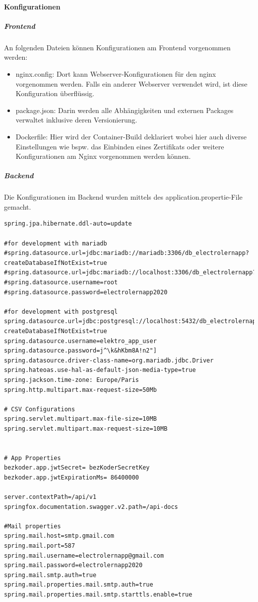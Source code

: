 \paragraph{Konfigurationen}
\subparagraph{Frontend}
An folgenden Dateien können Konfigurationen am Frontend vorgenommen werden:
\begin{itemize}
    \item nginx.config: Dort kann Webserver-Konfigurationen für den nginx vorgenommen werden. Falls ein anderer Webserver verwendet wird, ist diese Konfiguration überflüssig.
    \item package.json: Darin werden alle Abhängigkeiten und externen Packages verwaltet inklusive deren Versionierung.
    \item Dockerfile: Hier wird der Container-Build deklariert wobei hier auch diverse Einstellungen wie bspw. das Einbinden eines Zertifikats oder weitere Konfigurationen am Nginx vorgenommen werden können.
\end{itemize}
\newpage
\subparagraph{Backend}
Die Konfigurationen im Backend wurden mittels des application.propertie-File gemacht.
\begin{verbatim}
spring.jpa.hibernate.ddl-auto=update

#for development with mariadb
#spring.datasource.url=jdbc:mariadb://mariadb:3306/db_electrolernapp?
createDatabaseIfNotExist=true
#spring.datasource.url=jdbc:mariadb://localhost:3306/db_electrolernapp?
#spring.datasource.username=root
#spring.datasource.password=electrolernapp2020

#for development with postgresql
spring.datasource.url=jdbc:postgresql://localhost:5432/db_electrolernapp?
createDatabaseIfNotExist=true
spring.datasource.username=elektro_app_user
spring.datasource.password=j^\k&hKbm8A!n2"]
spring.datasource.driver-class-name=org.mariadb.jdbc.Driver
spring.hateoas.use-hal-as-default-json-media-type=true
spring.jackson.time-zone: Europe/Paris
spring.http.multipart.max-request-size=50Mb

# CSV Configurations
spring.servlet.multipart.max-file-size=10MB
spring.servlet.multipart.max-request-size=10MB


# App Properties
bezkoder.app.jwtSecret= bezKoderSecretKey
bezkoder.app.jwtExpirationMs= 86400000

server.contextPath=/api/v1
springfox.documentation.swagger.v2.path=/api-docs

#Mail properties
spring.mail.host=smtp.gmail.com
spring.mail.port=587
spring.mail.username=electrolernapp@gmail.com
spring.mail.password=electrolernapp2020
spring.mail.smtp.auth=true
spring.mail.properties.mail.smtp.auth=true
spring.mail.properties.mail.smtp.starttls.enable=true

\end{verbatim}
\newpage
